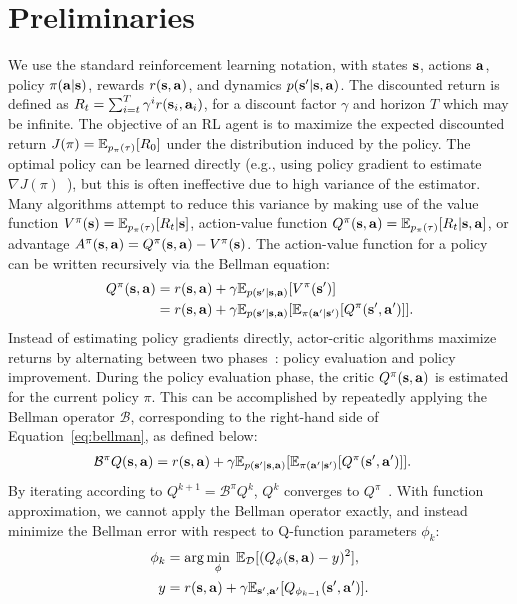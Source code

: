\documentclass[conference]{IEEEtran}
\begin{document}
\section{Preliminaries}\label{sec:background}
We use the standard reinforcement learning notation, with states $\mathbf{s}$, actions $\mathbf{a}$, policy $\pi(\mathbf{a}|\mathbf{s})$, rewards $r(\mathbf{s}, \mathbf{a})$, and dynamics $p(\mathbf{s}'|\mathbf{s}, \mathbf{a})$. The discounted return is defined as $R_t = \sum_{i=t}^T \gamma^i r(\mathbf{s}_i, \mathbf{a}_i)$, for a discount factor $\gamma$ and horizon $T$ which may be infinite. The objective of an RL agent is to maximize the expected discounted return $J(\pi) = \mathbb{E}_{p_\pi(\tau)}[R_0]$ under the distribution induced by the policy. 
The optimal policy can be learned directly (e.g., using policy gradient to estimate $\nabla J(\pi)$~\citep{williams1992reinforce}), but this is often ineffective due to high variance of the estimator. Many algorithms attempt to reduce this variance by making use of the value function $V^\pi(\mathbf{s}) = \mathbb{E}_{p_\pi(\tau)} [R_t|\mathbf{s}]$, action-value function $Q^\pi(\mathbf{s}, \mathbf{a}) = \mathbb{E}_{p_\pi(\tau)} [R_t|\mathbf{s}, \mathbf{a}]$, or advantage $A^\pi(\mathbf{s}, \mathbf{a}) = Q^\pi(\mathbf{s}, \mathbf{a}) - V^\pi(\mathbf{s})$. The action-value function for a policy can be written recursively via the Bellman equation:
\begin{align}
    Q^\pi(\st, \at) &= r(\st, \at) + \gamma \E_{p(\st'|\st,\at)} [V^\pi(\st')] \\ &= r(\st, \at) + \gamma \E_{p(\st'|\st,\at)} [\E_{\pi(\at'|\st')}[Q^\pi(\st', \at')]].
    \label{eq:bellman}
\end{align}
Instead of estimating policy gradients directly, actor-critic algorithms maximize returns by alternating between two phases~\citep{konda2000actorcritic}: policy evaluation and policy improvement. During the policy evaluation phase, the critic $Q^{\pi}(\mathbf{s},\mathbf{a})$ is estimated for the current policy $\pi$. This can be accomplished by repeatedly applying the Bellman operator $\mathcal{B}$, corresponding to the right-hand side of Equation~\ref{eq:bellman}, as defined below:
\begin{align} \label{eqn:policy_evaluation}
    \mathcal{B}^\pi Q(\st, \at) & = r(\st, \at) + \gamma \E_{p(\st'|\st,\at)} [\E_{\pi(\at'|\st')}[Q^\pi(\st', \at')]].
\end{align}
By iterating according to $Q^{k+1} = \mathcal{B}^\pi Q^k$, $Q^k$ converges to $Q^\pi$~\citep{sutton1998rl}. With function approximation, we cannot apply the Bellman operator exactly, and instead minimize the Bellman error with respect to Q-function parameters $\phi_k$:
\begin{align} \label{eqn:phi_obj}
    \phi_k &= \arg\min_\phi \; \E_\mathcal{D}[(Q_\phi(\st, \at) - y)^2], \\ y &= r(\st, \at) + \gamma \E_{\st',\at'}[Q_{\phi_{k-1}}(\st', \at')].
\end{align}
\end{document}
